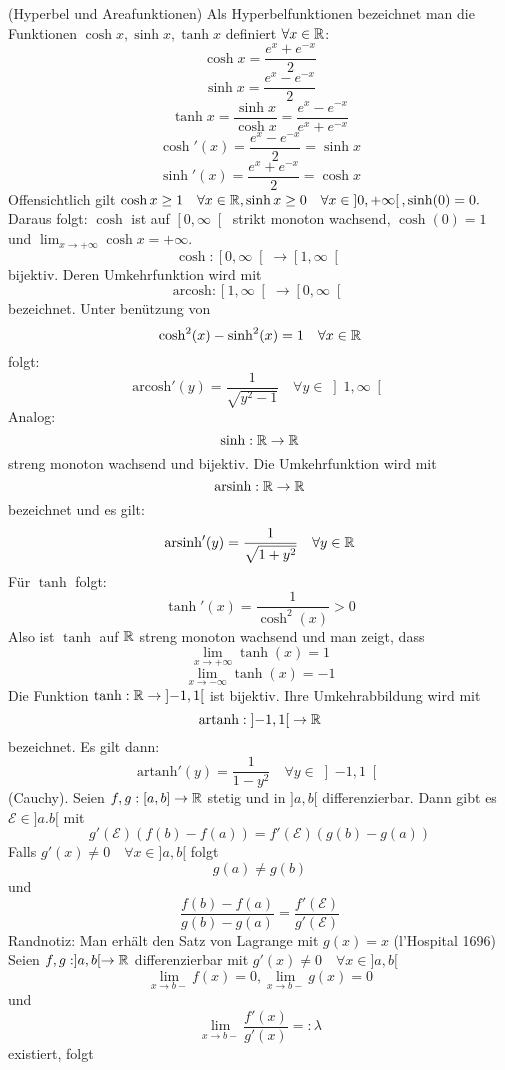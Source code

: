 \Bsp[4.20](Hyperbel und Areafunktionen) \newline
Als Hyperbelfunktionen bezeichnet man die Funktionen \(\cosh x, \sinh x, \tanh x\) definiert \( \forall x \in \mathbb{R} \):
\[ \cosh x = \frac{e^x + e^{-x}}{2}\]
\[ \sinh x = \frac{e^x - e^{-x}}{2}\]
\[ \tanh x = \frac{\sinh x }{\cosh x} = \frac{e^x - e^{-x}}{e^x+e^{-x}}\]
\[ \cosh'(x) = \frac{e^x - e^{-x}}{2} = \sinh x\]
\[ \sinh'(x) = \frac{e^x + e^{-x}}{2} = \cosh x\]
Offensichtlich gilt \(\cosh x \geq 1 \quad \forall x \in \mathbb{R}, \sinh x \geq 0 \quad \forall x \in \left]0,+\infty \right[, \sinh(0) = 0.\) Daraus folgt: \(\cosh \) ist auf \(\left[0,\infty\right[\) strikt monoton wachsend, \(\cosh(0) = 1\) und \( \lim_{x \rightarrow +\infty} \cosh x = +\infty\).
\[ \cosh : \left[0,\infty \right[ \rightarrow \left[1,\infty\right[\]
bijektiv. Deren Umkehrfunktion wird mit
\[ \text{arcosh} : \left[1,\infty\right[ \rightarrow \left[ 0, \infty \right[ \]
bezeichnet. Unter benützung von
\[ \cosh^2(x) - \sinh^2(x) = 1 \quad \forall x \in \mathbb{R} \]
folgt:
\[ \text{arcosh}'(y) = \frac{1}{\sqrt{y^2-1}} \quad \forall y \in \left]1,\infty\right[\]
Analog:
\[ \sinh : \mathbb{R} \rightarrow \mathbb{R}\]
streng monoton wachsend und bijektiv. Die Umkehrfunktion wird mit
\[ \text{arsinh} : \mathbb{R} \rightarrow \mathbb{R}\]
bezeichnet und es gilt:
\[ \text{arsinh}'(y) = \frac{1}{\sqrt{1 + y^2}} \quad \forall y \in \mathbb{R} \]
Für \(\tanh \) folgt:
\[ \tanh'(x) = \frac{1}{\cosh^2(x)} > 0\]
Also ist \( \tanh\) auf \( \mathbb{R}\) streng monoton wachsend und man zeigt, dass
\[ \lim_{x \rightarrow +\infty} \tanh(x) = 1\]
\[ \lim_{x \rightarrow -\infty} \tanh(x) = -1\]
Die Funktion \(\tanh : \mathbb{R} \rightarrow \left] -1,1\right[ \) ist bijektiv. Ihre Umkehrabbildung wird mit
\[\text{artanh} : \left]-1,1\right[ \rightarrow \mathbb{R} \]
bezeichnet. Es gilt dann:
\[ \text{artanh}'(y) = \frac{1}{1-y^2} \quad \forall y \in \left]-1,1\right[\]
 (Cauchy). Seien \(f,g : [a,b] \rightarrow \mathbb{R} \) stetig und in \(]a,b[\) differenzierbar. Dann gibt es \( \mathcal{E} \in ]a.b[ \) mit 
\[ g'(\mathcal{E}) (f(b) - f(a)) = f'(\mathcal{E}) (g(b) - g(a))\]
Falls \(g'(x) \neq 0 \quad \forall x \in ]a,b[ \) folgt
\[g(a) \neq g(b)\]
und
\[\frac{f(b) - f(a)}{g(b) - g(a) } = \frac{f'(\mathcal{E})}{g'(\mathcal{E})}\]
Randnotiz: Man erhält den Satz von Lagrange mit \(g(x) = x\)
 (l'Hospital 1696) Seien \(f,g : ]a,b[ \rightarrow \mathbb{R} \) differenzierbar mit \(g'(x) \neq 0 \quad \forall x \in ]a,b[\)
\[ \lim\limits_{x \rightarrow b-}f(x) = 0, \lim\limits_{x \rightarrow b-} g(x) = 0\]
und
\[ \lim\limits_{x \rightarrow b-} \frac{f'(x)}{g'(x)} =: \lambda\]
existiert, folgt
